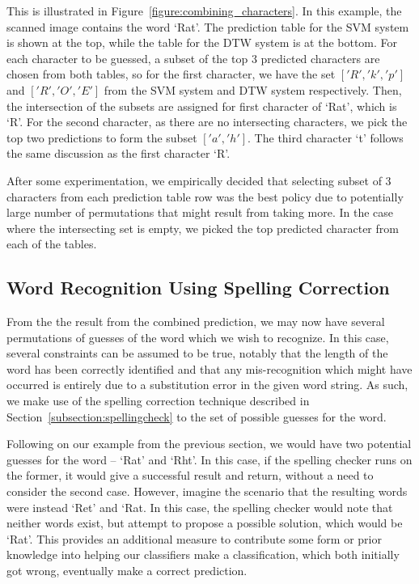 \documentclass[12pt]{article}
\begin{document}
	
	This is illustrated in Figure~\ref{figure:combining_characters}. In this example, the scanned image contains the word `Rat'. The prediction table for the SVM system is shown at the top, while the table for the DTW system is at the bottom. For each character to be guessed, a subset of the top 3 predicted characters are chosen from both tables, so for the first character, we have the set $['R', 'k', 'p']$ and $['R', 'O', 'E']$ from the SVM system and DTW system respectively. Then, the intersection of the subsets are assigned for first character of `Rat', which is `R'. For the second character, as there are no intersecting characters, we pick the top two predictions to form the subset $['a', 'h']$. The third character `t' follows the same discussion as the first character `R'.
	
	After some experimentation, we empirically decided that selecting subset of 3 characters from each prediction table row was the best policy due to potentially large number of permutations that might result from taking more. In the case where the intersecting set is empty, we picked the top predicted character from each of the tables.
	
\subsection{Word Recognition Using Spelling Correction}
	\label{subsection:experiments:combinedword}
	From the the result from the combined prediction, we may now have several permutations of guesses of the word which we wish to recognize. In this case, several constraints can be assumed to be true, notably that the length of the word has been correctly identified and that any mis-recognition which might have occurred is entirely due to a substitution error in the given word string. As such, we make use of the spelling correction technique described in Section~\ref{subsection:spellingcheck} to the set of possible guesses for the word.  
	
	Following on our example from the previous section, we would have two potential guesses for the word -- `Rat' and `Rht'. In this case, if the spelling checker runs on the former, it would give a successful result and return, without a need to consider the second case. However, imagine the scenario that the resulting words were instead `Ret' and `Rat. In this case, the spelling checker would note that neither words exist, but attempt to propose a possible solution, which would be `Rat'. This provides an additional measure to contribute some form or prior knowledge into helping our classifiers make a classification, which both initially got wrong, eventually make a correct prediction.
	
\end{document}
